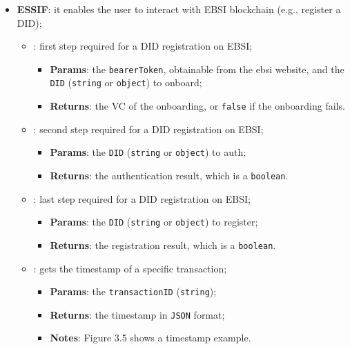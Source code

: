 \begin{itemize}
    \item \textbf{ESSIF}: it enables the user to interact with EBSI blockchain (e.g.,
    register a DID);
    \begin{itemize}
        \setlength{\itemsep}{0.4cm}
        \item[] : first step required for a DID registration on EBSI;
        \begin{itemize}
            \item \textbf{Params}: the \texttt{bearerToken}, obtainable from the ebsi
            website, and the \texttt{DID} (\texttt{string} or \texttt{object}) to onboard;
            \item \textbf{Returns}: the VC of the onboarding, or \texttt{false} if the
            onboarding fails.
        \end{itemize}
        \item[] : second step required for a DID registration on EBSI;
        \begin{itemize}
            \item \textbf{Params}: the \texttt{DID} (\texttt{string} or \texttt{object}) to auth;
            \item \textbf{Returns}: the authentication result, which is a \texttt{boolean}.
        \end{itemize}
        \item[] : last step required for a DID registration on EBSI;
        \begin{itemize}
            \item \textbf{Params}: the \texttt{DID} (\texttt{string} or \texttt{object}) to register;
            \item \textbf{Returns}: the registration result, which is a \texttt{boolean}.
        \end{itemize}
        \item[] : gets the timestamp of a specific transaction;
        \begin{itemize}
            \item \textbf{Params}: the \texttt{transactionID} (\texttt{string});
            \item \textbf{Returns}: the timestamp in \texttt{JSON} format;
            \item \textbf{Notes}: Figure 3.5 shows a timestamp example.
        \end{itemize}
        \clearpage
        \begin{center}
            \label{fig:timestamp}

\end{center}
\end{itemize}
\end{itemize}
